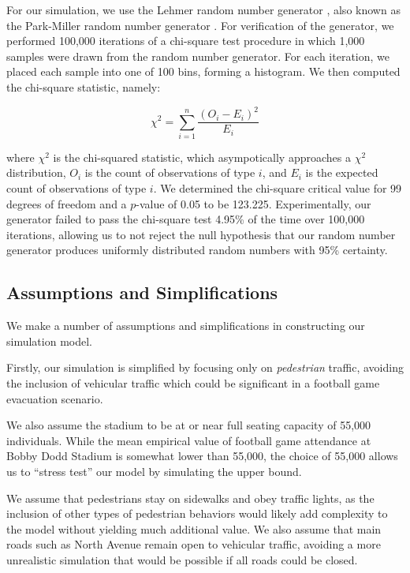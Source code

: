 \documentclass[12pt]{article}
\begin{document}
For our simulation, we use the Lehmer random number generator
\cite{payne1969coding}, also known as the Park-Miller random number generator
\cite{park1988random}. For verification of the generator, we performed
100,000 iterations of a chi-square test procedure in which 1,000 samples were
drawn from the random number generator. For each iteration, we placed each
sample into one of 100 bins, forming a histogram. We then computed the
chi-square statistic, namely:

\begin{equation}
{\chi}^2=\sum_{i=1}^{n} \frac{(O_i - E_i)^2}{E_i}
\end{equation}

where ${\chi}^2$ is the chi-squared statistic, which asympotically approaches
a ${\chi}^2$ distribution, $O_i$ is the count of observations of type $i$,
and $E_i$ is the expected count of observations of type $i$. We determined the
chi-square critical value for 99 degrees of freedom and a $p$-value of 0.05 to be
123.225. Experimentally, our generator failed to pass the chi-square test 4.95\%
of the time over 100,000 iterations, allowing us to not reject the null
hypothesis that our random number generator produces uniformly distributed
random numbers with 95\% certainty.

\subsection{Assumptions and Simplifications}
We make a number of assumptions and simplifications in constructing our
simulation model.

Firstly, our simulation is simplified by focusing only on
\textit{pedestrian} traffic, avoiding the inclusion of vehicular traffic which
could be significant in a football game evacuation scenario.

We also assume the stadium to be at or near full seating capacity of 55,000
individuals. While the mean empirical value of football game attendance at
Bobby Dodd Stadium is somewhat lower than 55,000, the choice
of 55,000 allows us to ``stress test'' our model by simulating the upper bound.

We assume that pedestrians stay on sidewalks and obey traffic lights, as the
inclusion of other types of pedestrian behaviors would likely add complexity
to the model without yielding much additional value. We also assume that main
roads such as North Avenue remain open to vehicular traffic, avoiding a more
unrealistic simulation that would be possible if all roads could be closed.
\end{document}
